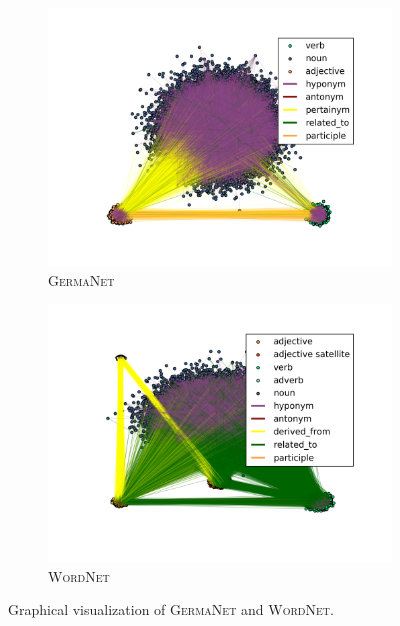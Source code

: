 \begin{figure}[htbp!]
{
\centering
\begin{subfigure}{.5\textwidth}
  \centering
  \includegraphics[width=\linewidth]{img/germanet.png}
  \caption{\textsc{GermaNet}}\label{snt-lex:fig:germanet}
\end{subfigure}%
\begin{subfigure}{.5\textwidth}
  \centering
  \includegraphics[width=\linewidth]{img/wordnet.png}
  \caption{\textsc{WordNet}}\label{snt-lex:fig:wordnet}
\end{subfigure}
}
\caption{Graphical visualization of \textsc{GermaNet} and
      \textsc{WordNet}.}\label{snt:fig:crp-sent-emo-distr}
\end{figure}

